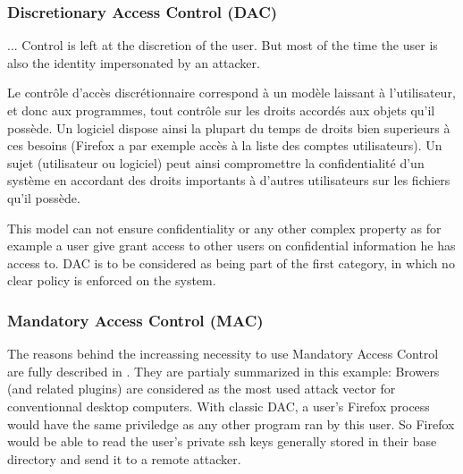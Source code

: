 \documentclass[pdftex,a4paper,titlepage,11pt]{article}
\begin{document}

\subsubsection{Discretionary Access Control (DAC)}

... Control is left at the discretion of the user. But most of the time the user is also the identity impersonated by an attacker.

Le contrôle d'accès discrétionnaire correspond à un modèle laissant à l'utilisateur, et donc aux programmes, tout contrôle sur les droits accordés aux objets qu'il possède. Un logiciel dispose ainsi la plupart du temps de droits bien superieurs à ces besoins (Firefox a par exemple accès à la liste des comptes utilisateurs). Un sujet (utilisateur ou logiciel) peut ainsi compromettre la confidentialité d'un système en accordant des droits importants à d'autres utilisateurs sur les fichiers qu'il possède.

\bigskip

This model can not ensure confidentiality or any other complex property as for example a user give grant access to other users on confidential information he has access to. DAC is to be considered as being part of the first category, in which no clear policy is enforced on the system. 


\subsubsection{Mandatory Access Control (MAC)}

The reasons behind the increassing necessity to use Mandatory Access Control are fully described in \cite{NSATIOF}. They are partialy summarized in this example: Browers (and related plugins) are considered as the most used attack vector for conventionnal desktop computers. With classic DAC, a user's Firefox process would have the same priviledge as any other program ran by this user. So Firefox would be able to read the user's private ssh keys generally stored in their base directory and send it to a remote attacker.
\end{document}
